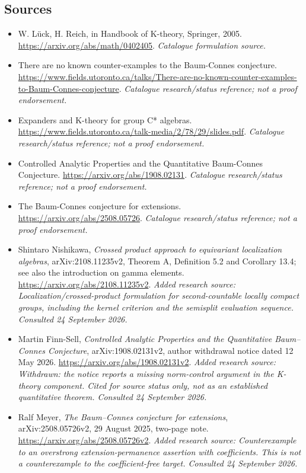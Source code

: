 \documentclass[11pt]{article}
\begin{document}
\subsection{Sources}
\begin{itemize}\raggedright
\item[\textnormal{[S1]}]\hypertarget{source:statement:1}{} W. Lück, H. Reich, in Handbook of K-theory, Springer, 2005.
\url{https://arxiv.org/abs/math/0402405}.
{\small\textit{Catalogue formulation source.}}
\item[\textnormal{[S2]}]\hypertarget{source:statement:2}{} There are no known counter-examples to the Baum-Connes conjecture.
\url{https://www.fields.utoronto.ca/talks/There-are-no-known-counter-examples-to-Baum-Connes-conjecture}.
{\small\textit{Catalogue research/status reference; not a proof endorsement.}}
\item[\textnormal{[S3]}]\hypertarget{source:statement:3}{} Expanders and K-theory for group C* algebras.
\url{https://www.fields.utoronto.ca/talk-media/2/78/29/slides.pdf}.
{\small\textit{Catalogue research/status reference; not a proof endorsement.}}
\item[\textnormal{[S4]}]\hypertarget{source:statement:4}{} Controlled Analytic Properties and the Quantitative Baum-Connes Conjecture.
\url{https://arxiv.org/abs/1908.02131}.
{\small\textit{Catalogue research/status reference; not a proof endorsement.}}
\item[\textnormal{[S5]}]\hypertarget{source:statement:5}{} The Baum-Connes conjecture for extensions.
\url{https://arxiv.org/abs/2508.05726}.
{\small\textit{Catalogue research/status reference; not a proof endorsement.}}
\item[\textnormal{[E1]}]\hypertarget{extra:statement:1}{} Shintaro Nishikawa, \emph{Crossed product approach to equivariant localization algebras}, arXiv:2108.11235v2, Theorem A, Definition 5.2 and Corollary 13.4; see also the introduction on gamma elements.
\url{https://arxiv.org/abs/2108.11235v2}.
{\small\textit{Added research source: Localization/crossed-product formulation for second-countable locally compact groups, including the kernel criterion and the semisplit evaluation sequence. Consulted 24 September 2026.}}
\item[\textnormal{[E2]}]\hypertarget{extra:statement:2}{} Martin Finn-Sell, \emph{Controlled Analytic Properties and the Quantitative Baum--Connes Conjecture}, arXiv:1908.02131v2, author withdrawal notice dated 12 May 2026.
\url{https://arxiv.org/abs/1908.02131v2}.
{\small\textit{Added research source: Withdrawn: the notice reports a missing norm-control argument in the K-theory component. Cited for source status only, not as an established quantitative theorem. Consulted 24 September 2026.}}
\item[\textnormal{[E3]}]\hypertarget{extra:statement:3}{} Ralf Meyer, \emph{The Baum--Connes conjecture for extensions}, arXiv:2508.05726v2, 29 August 2025, two-page note.
\url{https://arxiv.org/abs/2508.05726v2}.
{\small\textit{Added research source: Counterexample to an overstrong extension-permanence assertion with coefficients. This is not a counterexample to the coefficient-free target. Consulted 24 September 2026.}}
\end{itemize}
\end{document}
